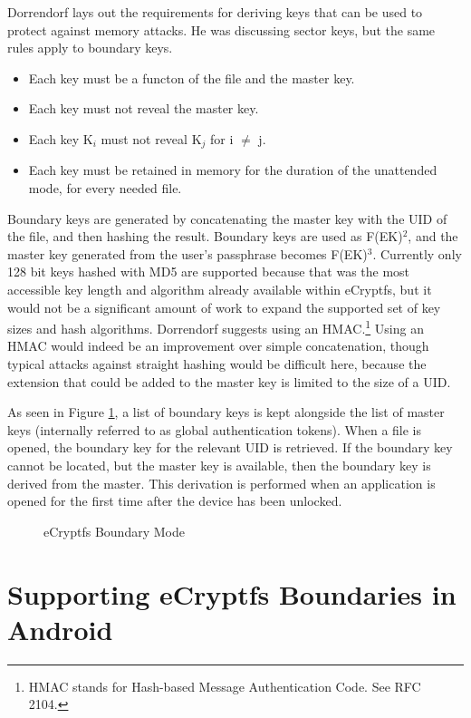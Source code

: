 Dorrendorf \citeyear{Dorrendorf2011} lays out the requirements for deriving keys that can be used to protect against memory attacks.
He was discussing sector keys, but the same rules apply to boundary keys.
\begin{itemize}
\item{Each key must be a functon of the file and the master key.}
\item{Each key must not reveal the master key.}
\item{Each key K$_i$ must not reveal K$_j$ for i $\not=$ j.}
\item{Each key must be retained in memory for the duration of the unattended mode, for every needed file.}
\end{itemize}
Boundary keys are generated by concatenating the master key with the UID of the file, and then hashing the result.  Boundary keys
are used as F(EK)$^{2}$, and the master key generated from the user's passphrase becomes F(EK)$^{3}$. Currently only 128 bit keys
hashed with MD5 are supported because that was the most accessible key length and algorithm already available within eCryptfs, but
it would not be a significant amount of work to expand the supported set of key sizes and hash algorithms.  Dorrendorf
\citeyear{Dorrendorf2011} suggests using an HMAC.\footnote{HMAC stands for Hash-based Message Authentication Code. See RFC 2104.}
Using an HMAC would indeed be an improvement over simple concatenation, though typical attacks against straight hashing would be
difficult here, because the extension that could be added to the master key is limited to the size of a UID.

As seen in Figure \ref{fig:ecryptfsboundary}, a list of boundary keys is kept alongside the list of master keys (internally referred
to as global authentication tokens).  When a file is opened, the boundary key for the relevant UID is retrieved. If the boundary key
cannot be located, but the master key is available, then the boundary key is derived from the master. This derivation is performed
when an application is opened for the first time after the device has been unlocked.

\begin{figure}[!htb] 
\begin{center}
\end{center}
\caption{eCryptfs Boundary Mode} \label{fig:ecryptfsboundary} \end{figure}

\section{Supporting eCryptfs Boundaries in Android}

